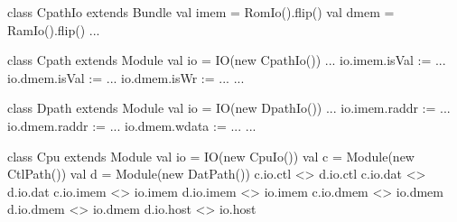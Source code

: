 \documentclass[twocolumn,10pt]{article}
\begin{document}


\begin{scala}
class CpathIo extends Bundle {
  val imem = RomIo().flip()
  val dmem = RamIo().flip()
  ...
}
\end{scala}



\begin{scala}
class Cpath extends Module {
  val io = IO(new CpathIo())
  ...
  io.imem.isVal := ...
  io.dmem.isVal := ...
  io.dmem.isWr  := ...
  ...
}

class Dpath extends Module {
  val io = IO(new DpathIo())
  ...
  io.imem.raddr := ...
  io.dmem.raddr := ...
  io.dmem.wdata := ...
  ...
}
\end{scala}



\begin{scala}
class Cpu extends Module {
  val io = IO(new CpuIo())
  val c  = Module(new CtlPath())
  val d  = Module(new DatPath())
  c.io.ctl  <> d.io.ctl
  c.io.dat  <> d.io.dat
  c.io.imem <> io.imem
  d.io.imem <> io.imem
  c.io.dmem <> io.dmem
  d.io.dmem <> io.dmem
  d.io.host <> io.host
}
\end{scala}


%
%
%
%
%
\end{document}
